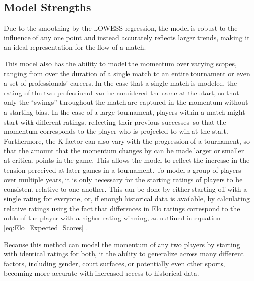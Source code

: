 \documentclass[letterpaper, 12pt]{article}
\begin{document}
        \subsection{Model Strengths}

        Due to the smoothing by the LOWESS regression, the model is robust to the influence of any one point and instead accurately reflects larger trends, making it an ideal representation for the flow of a match. 

        This model also has the ability to model the momentum over varying scopes, ranging from over the duration of a single match to an entire tournament or even a set of professionals' careers. In the case that a single match is modeled, the rating of the two professional can be considered the same at the start, so that only the ``swings'' throughout the match are captured in the momentum without a starting bias. In the case of a large tournament, players within a match might start with different ratings, reflecting their previous successes, so that the momentum corresponds to the player who is projected to win at the start. Furthermore, the K-factor can also vary with the progression of a tournament, so that the amount that the momentum changes by can be made larger or smaller at critical points in the game. This allows the model to reflect the increase in the tension perceived at later games in a tournament. To model a group of players over multiple years, it is only necessary for the starting ratings of players to be consistent relative to one another. This can be done by either starting off with a single rating for everyone, or, if enough historical data is available, by calculating relative ratings using the fact that differences in Elo ratings correspond to the odds of the player with a higher rating winning, as outlined in equation \ref{eq:Elo_Expected_Scores} \cite{Elo1986}.

        Because this method can model the momentum of any two players by starting with identical ratings for both, it the ability to generalize across many different factors, including gender, court surfaces, or potentially even other sports, becoming more accurate with increased access to historical data. 
        
        


\end{document}
